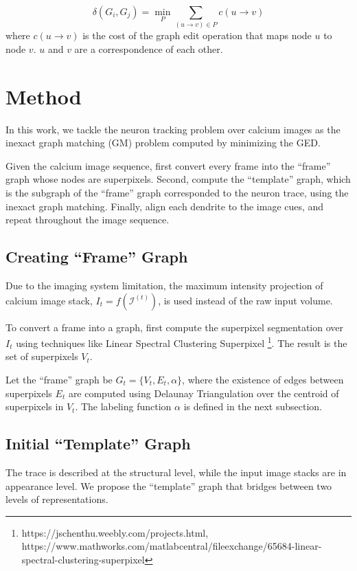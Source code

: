 \documentclass[10pt,letterpaper]{article}
\begin{document}
\begin{equation}
\delta(G_i, G_j) = \min_P \sum_{(u \rightarrow v) \in P} c(u \rightarrow v)
\end{equation}
where $c(u \rightarrow v)$ is the cost of the graph edit operation that maps node $u$ to node $v$. $u$ and $v$ are a correspondence of each other.

\section{Method}
In this work, we tackle the neuron tracking problem over calcium images as the inexact graph matching (GM) problem \cite{gao2010} computed by minimizing the GED.

Given the calcium image sequence, first convert every frame into the ``frame'' graph whose nodes are superpixels. Second, compute the ``template'' graph, which is the subgraph of the ``frame'' graph corresponded to the neuron trace, using the inexact graph matching. Finally, align each dendrite to the image cues, and repeat throughout the image sequence.


\subsection{Creating ``Frame'' Graph}
Due to the imaging system limitation, the maximum intensity projection of calcium image stack, $I_t = f(\mathcal{I}^{(t)})$, is used instead of the raw input volume. 

To convert a frame into a graph, first compute the superpixel segmentation over $I_t$ using techniques like Linear Spectral Clustering Superpixel \cite{li2015, chen2017}\footnote{https://jschenthu.weebly.com/projects.html,\\ https://www.mathworks.com/matlabcentral/fileexchange/65684-linear-spectral-clustering-superpixel}. The result is the set of superpixels $V_t$. 

Let the ``frame'' graph be $G_t = \{ V_t, E_t, \alpha \}$, where the existence of edges between superpixels $E_t$ are computed using Delaunay Triangulation over the centroid of superpixels in $V_t$. The labeling function $\alpha$ is defined in the next subsection.


\subsection{Initial ``Template'' Graph}
The trace is described at the structural level, while the input image stacks are in appearance level. We propose the ``template'' graph that bridges between two levels of representations.
\end{document}
